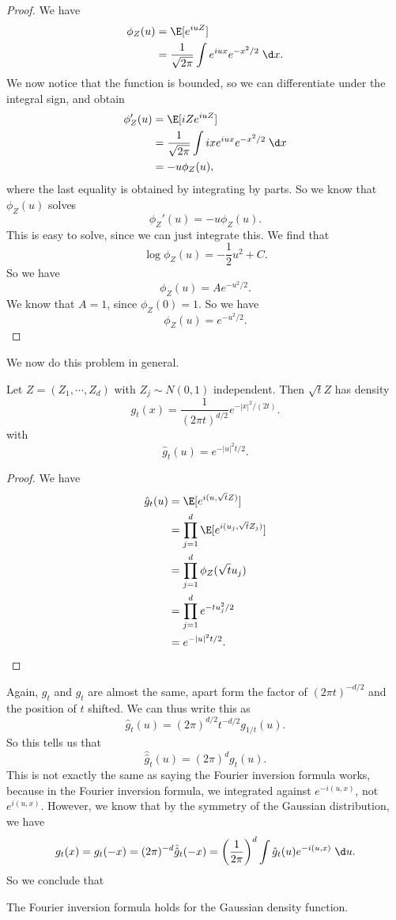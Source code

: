 \documentclass[a4paper]{article}
\begin{document}
\begin{proof}
  We have
  \begin{align*}
    \phi_Z(u) &= \E[e^{iuZ}]\\
    &= \frac{1}{\sqrt{2\pi}} \int e^{iux} e^{-x^2/2}\;\d x.
  \end{align*}
  We now notice that the function is bounded, so we can differentiate under the integral sign, and obtain
  \begin{align*}
    \phi_Z'(u) &= \E[iZ e^{iuZ}]\\
    &= \frac{1}{\sqrt{2\pi}} \int ix e^{iux} e^{-x^2/2}\;\d x\\
    &= - u\phi_Z(u),
  \end{align*}
  where the last equality is obtained by integrating by parts. So we know that $\phi_Z(u)$ solves
  \[
    \phi_Z'(u) = -u \phi_Z(u).
  \]
  This is easy to solve, since we can just integrate this. We find that
  \[
    \log \phi_Z(u) = - \frac{1}{2}u^2 + C.
  \]
  So we have
  \[
    \phi_Z(u) = A e^{-u^2/2}.
  \]
  We know that $A = 1$, since $\phi_Z(0) = 1$. So we have
  \[
    \phi_Z(u) = e^{-u^2/2}.
  \]
\end{proof}

We now do this problem in general.
\begin{prop}
  Let $Z = (Z_1, \cdots, Z_d)$ with $Z_j \sim N(0, 1)$ independent. Then $\sqrt{t} Z$ has density
  \[
    g_t(x) = \frac{1}{(2\pi t)^{d/2}} e^{-|x|^2/(2t)}.
  \]
  with
  \[
    \hat{g}_t(u) = e^{-|u|^2 t/2}.
  \]
\end{prop}

\begin{proof}
  We have
  \begin{align*}
    \hat{g}_t(u) &= \E[e^{i(u, \sqrt{t}Z)}]\\
    &= \prod_{j = 1}^d \E[e^{i(u_j, \sqrt{t} Z_j)}]\\
    &= \prod_{j = 1}^d \phi_Z(\sqrt{t} u_j)\\
    &= \prod_{j = 1}^d e^{-t u_j^2/2}\\
    &= e^{-|u|^2 t/2}.
  \end{align*}
\end{proof}
Again, $g_t$ and $\hat{g}_t$ are almost the same, apart form the factor of $(2\pi t)^{-d/2}$ and the position of $t$ shifted. We can thus write this as
\[
  \hat{g}_t(u) = (2\pi)^{d/2} t^{-d/2} g_{1/t} (u).
\]
So this tells us that
\[
  \hat{\hat{g}}_t(u) = (2\pi)^d g_t(u).
\]
This is not exactly the same as saying the Fourier inversion formula works, because in the Fourier inversion formula, we integrated against $e^{-i(u, x)}$, not $e^{i(u, x)}$. However, we know that by the symmetry of the Gaussian distribution, we have
\[
  g_t(x) = g_t(-x) = (2\pi)^{-d} \hat{\hat{g}}_t (-x) = \left(\frac{1}{2\pi}\right)^d \int \hat{g}_t(u) e^{-i(u, x)}\;\d u.
\]
So we conclude that
\begin{lemma}
  The Fourier inversion formula holds for the Gaussian density function.
\end{lemma}
\end{document}
